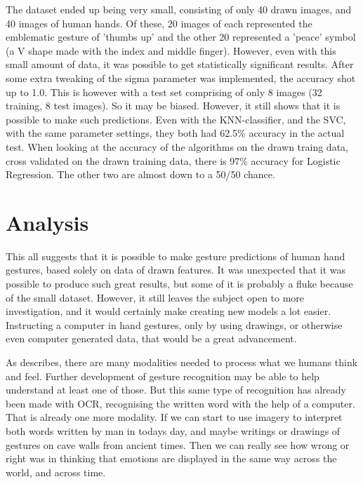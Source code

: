 \documentclass[11pt,a4paper]{article}
\begin{document}
The dataset ended up being very small, consisting of only 40 drawn images, and 40 images of human hands. Of these, 20 images of each represented the emblematic gesture of 'thumbs up' and the other 20 represented a 'peace' symbol (a V shape made with the index and middle finger). However, even with this small amount of data, it was possible to get statistically significant results. After some extra tweaking of the sigma parameter was implemented, the accuracy shot up to 1.0. This is however with a test set comprising of only 8 images (32 training, 8 test images). So it may be biased. However, it still shows that it is possible to make such predictions. Even with the KNN-classifier, and the SVC, with the same parameter settings, they both had 62.5\% accuracy in the actual test. When looking at the accuracy of the algorithms on the drawn traing data, cross validated on the drawn training data, there is 97\% accuracy for Logistic Regression. The other two are almost down to a 50/50 chance.


\section{Analysis}
\label{sec:analysis-1}

This all suggests that it is possible to make gesture predictions of human hand gestures, based solely on data of drawn features. It was unexpected that it was possible to produce such great results, but some of it is probably a fluke because of the small dataset. However, it still leaves the subject open to more investigation, and it would certainly make creating new models a lot easier. Instructing a computer in hand gestures, only by using drawings, or otherwise even computer generated data, that would be a great advancement.

\vspace{0.5pc}

As \cite{ruiter} describes, there are many modalities needed to process what we humans think and feel. Further development of gesture recognition may be able to help understand at least one of those. But this same type of recognition has already been made with OCR, recognising the written word with the help of a computer. That is already one more modality. If we can start to use imagery to interpret both words written by man in todays day, and maybe writings or drawings of gestures on cave walls from ancient times. Then we can really see how wrong or right \cite{ekman} was in thinking that emotions are displayed in the same way across the world, and across time.
\end{document}
